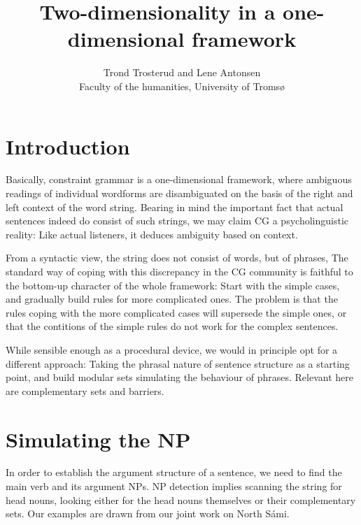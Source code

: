 \documentclass[a4paper,english]{article}
\begin{document}
\title{Two-dimensionality in a one-dimensional framework}

\author{Trond Trosterud and Lene Antonsen \\ 
Faculty of the humanities,  University of Tromsø}


\maketitle


\section{Introduction}

Basically, constraint grammar is a one-dimensional framework, where ambiguous readings of individual wordforms are disambiguated on the basis of the right and left context of the word string. Bearing in mind the important fact that actual sentences indeed do consist of such strings, we may claim CG a psycholinguistic reality: Like actual listeners, it deduces ambiguity based on context.

From a syntactic view, the string does not consist of words, but of phrases, The standard way of coping with this discrepancy in the CG community is faithful to the bottom-up character of the whole framework: Start with the simple cases, and gradually build rules for more complicated ones. The problem is that the rules coping with the more complicated cases will supersede the simple ones, or that the contitions of the simple rules do not work for the complex sentences.

While sensible enough as a procedural device, we would in principle opt for a different approach: Taking the phrasal nature of sentence structure as a starting point, and build modular sets simulating the behaviour of phrases. Relevant here are complementary sets and barriers.

\section{Simulating the NP}

In order to establish the argument structure of a sentence, we need to find the main verb and its argument NPs. NP detection implies scanning the string for head nouns, looking either for the head nouns themselves or their complementary sets. Our examples are drawn from our joint work on North Sámi.
\end{document}
